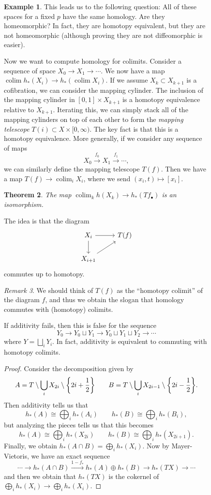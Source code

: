 \documentclass[leqno, openany]{memoir}
\newtheorem{thm}{Theorem}[section]
\theoremstyle{definition}
\newtheorem{exm}[thm]{Example}
\theoremstyle{remark}
\newtheorem{rmk}[thm]{Remark}
\theoremstyle{plain}
\theoremstyle{definition}
\theoremstyle{remark}
\DeclareMathOperator{\colim}{colim}
\begin{document}
\begin{figure}[H]
\begin{exm}
    This leads us to the following question: All of these spaces for a fixed
$p$ have the same homology. Are they homeomorphic? In fact, they are homotopy
equivalent, but they are not homeomorphic (although proving they are not
diffeomorphic is easier).  \end{exm}

Now we want to compute homology for colimits. Consider a sequence of space $X_0
\to X_1 \to \cdots$. We now have a map $\colim h_*(X_i) \to h_*(\colim X_i)$.
If we assume $X_k \subset X_{k+1}$ is a cofibration, we can consider the
mapping cylinder. The inclusion of the mapping cylinder in $[0,1] \times
X_{k+1}$ is a homotopy equivalence relative to $X_{k+1}$. Iterating this, we
can simply stack all of the mapping cylinders on top of each other to form the
\textit{mapping telescope} $T(i) \subset X \times [0, \infty)$. The key fact is
that this is a homotopy equivalence. More generally, if we consider any
sequence of maps \[ X_0 \xrightarrow{f_0} X_1 \xrightarrow{f_1} \cdots, \] we
can similarly define the mapping telescope $T(f)$. Then we have a map $T(f) \to
\colim_i X_i$, where we send $(x_i, t) \mapsto [x_i]$.

\begin{thm} The map $\colim_k h(X_k) \to h_*(Tf_{\bullet})$ is an isomorphism.
\end{thm}

The idea is that the diagram \begin{equation*} \begin{tikzcd} X_i \arrow{d}
\arrow{r} & T(f) \\ X_{i+1} \arrow{ur} \end{tikzcd} \end{equation*} commutes up
to homotopy. 

\begin{rmk} We should think of $T(f)$ as the ``homotopy colimit'' of the
diagram $f$, and thus we obtain the slogan that homology commutes with
(homotopy) colimits.  \end{rmk}

If additivity fails, then this is false for the sequence \[ Y_0 \to Y_0 \sqcup
Y_1 \to Y_0 \sqcup Y_1 \sqcup Y_2 \to \cdots \] where $Y = \bigsqcup_i Y_i$. In
fact, additivity is equivalent to commuting with homotopy colimits.

\begin{proof} Consider the decomposition given by \[ A = T \setminus \bigcup_i
    X_{2i} \setminus \qty{2i + \frac{1}{2}} \qquad B = T \setminus \bigcup_i
    X_{2i-1} \setminus \qty{2i - \frac{1}{2}}. \] Then additivity tells us that
    \[ h_*(A) \cong \bigoplus_i h_*(A_i) \qquad h_*(B) \cong \bigoplus_i
    h_*(B_i), \] but analyzing the pieces tells us that this becomes \[ h_*(A)
\cong \bigoplus_i h_*(X_{2i}) \qquad h_*(B) \cong \bigoplus_i h_*(X_{2i+1}). \]
Finally, we obtain $h_*(A \cap B) = \bigoplus_i h_*(X_i)$. Now by
Mayer-Vietoris, we have an exact sequence \[ \cdots \to h_*(A \cap B)
\xrightarrow{1-f_*} h_*(A) \oplus h_*(B) \to h_*(TX) \to \cdots \] and then we
obtain that $h_*(TX)$ is the cokernel of $\bigoplus_i h_*(X_i) \to \bigoplus_i
h_*(X_i)$.  \end{proof}


\end{figure}
\end{document}
